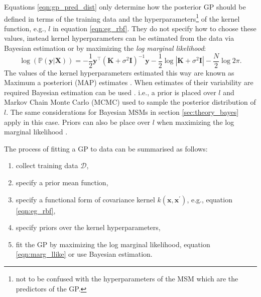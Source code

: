 Equations \ref{eqn:gp_pred_dist} only determine how the posterior GP should be defined in terms of the training data and the hyperparameters\footnote{not to be confused with the hyperparameters of the MSM which are the predictors of the GP.} of the kernel function, e.g., $l$ in equation \ref{eqn:eg_rbf}.  They do not specify how to choose these values, instead kernel hyperparameters can be estimated from the data via Bayesian estimation or by maximizing the \emph{log marginal likelihood}\cite{rasmussenGaussianProcessesMachine2006}:
\begin{equation}\label{eqn:marg_llike}
\log{\left( \mathbb{P}(\mathbf{y} | \mathbf{X})\right)}=-\frac{1}{2} \mathbf{y}^{\top}\left(\mathbf{K}+\sigma^{2} \mathbf{I}\right)^{-1} \mathbf{y}-\frac{1}{2} \log \left|\mathbf{K}+\sigma^{2} \mathbf{I}\right|-\frac{N}{2} \log 2 \pi.
\end{equation}
The values of the kernel hyperparameters estimated this way are known as Maximum a posteriori (MAP) estimates \cite{rasmussenGaussianProcessesMachine2006}. When estimates of their variability are required Bayesian estimation can be used \cite{gelmanBayesianDataAnalysis2014}. i.e., a prior is placed over $l$ and Markov Chain Monte Carlo (MCMC) used to sample the posterior distribution of $l$. The same considerations for Bayesian MSMs in section \ref{sec:theory_bayes} apply in this case. Priors can also be place over $l$ when maximizing the log marginal likelihood \cite{rasmussenGaussianProcessesMachine2006}.

The process of fitting a GP to data can be summarised as follows:
\begin{enumerate}
    \item collect training data $\mathcal{D}$, 
    \item specify a prior mean function, 
    \item  specify a functional form of covariance kernel $k(\mathbf{x}, \mathbf{x}^{\prime})$, e.g., equation \ref{eqn:eg_rbf}, 
    \item specify priors over the kernel hyperparameters, 
    \item fit the GP by maximizing the log marginal likelihood, equation \ref{eqn:marg_llike} or use Bayesian estimation. 
\end{enumerate}

